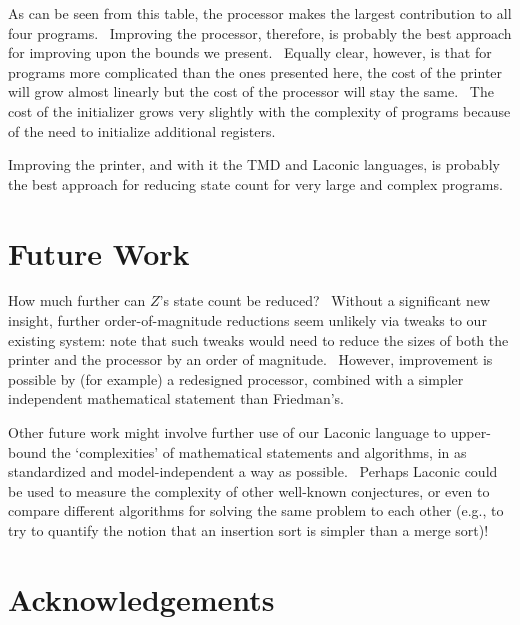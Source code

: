 \documentclass[11pt]{article}
\begin{document}
As can be seen from this table, the processor makes the largest contribution to all four programs. \ Improving the processor, therefore, is probably the best approach for improving upon the bounds we present. \ Equally clear, however, is that for programs more complicated than the ones presented here, the cost of the printer will grow almost linearly but the cost of the processor will stay the same. \ The cost of the initializer grows very slightly with the complexity of programs because of the need to initialize additional registers.

Improving the printer, and with it the TMD and Laconic languages, is probably the best approach for reducing state count for very large and complex programs.

\section{Future Work}

How much further can $Z$'s state count be reduced? \ Without a significant new insight, further order-of-magnitude reductions seem unlikely via tweaks to our existing system: note that such tweaks would need to reduce the sizes of both the printer and the processor by an order of magnitude. \ However, improvement is possible by (for example) a redesigned processor, combined with a simpler independent mathematical statement than Friedman's.

Other future work might involve further use of our Laconic language to upper-bound the `complexities' of mathematical statements and algorithms, in as standardized and model-independent a way as possible. \ Perhaps Laconic could be used to measure the complexity of other well-known conjectures, or even to compare different algorithms for solving the same problem to each other (e.g., to try to quantify the notion that an insertion sort is simpler than a merge sort)!

\section{Acknowledgements}

\end{document}
